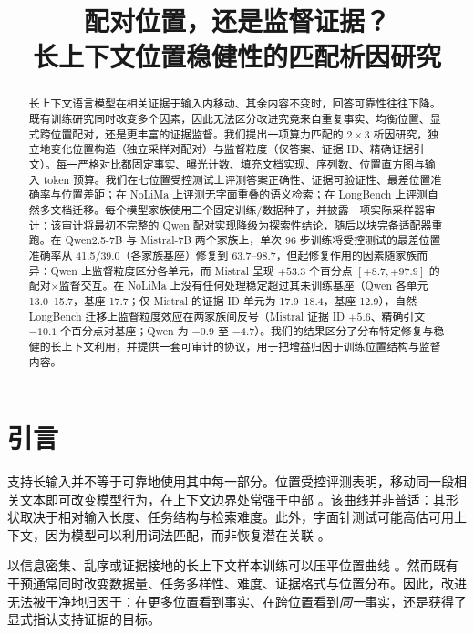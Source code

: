 \documentclass[11pt]{article}
\title{配对位置，还是监督证据？\\
长上下文位置稳健性的匹配析因研究}
\author{\pending{作者姓名、排序、单位与联系邮箱}}
\date{}
\begin{document}
\maketitle

\begin{abstract}
长上下文语言模型在相关证据于输入内移动、其余内容不变时，回答可靠性往往下降。既有训练研究同时改变多个因素，因此无法区分改进究竟来自重复事实、均衡位置、显式跨位置配对，还是更丰富的证据监督。我们提出一项算力匹配的 $2\times3$ 析因研究，独立地变化位置构造（独立采样对配对）与监督粒度（仅答案、证据 ID、精确证据引文）。每一严格对比都固定事实、曝光计数、填充文档实现、序列数、位置直方图与输入 token 预算。我们在七位置受控测试上评测答案正确性、证据可验证性、最差位置准确率与位置差距；在 NoLiMa 上评测无字面重叠的语义检索；在 LongBench 上评测自然多文档迁移。每个模型家族使用三个固定训练/数据种子，并披露一项实际采样器审计：该审计将最初不完整的 Qwen 配对实现降级为探索性结论，随后以块完备适配器重跑。在 Qwen2.5-7B 与 Mistral-7B 两个家族上，单次 96 步训练将受控测试的最差位置准确率从 41.5/39.0（各家族基座）修复到 63.7--98.7，但起修复作用的因素随家族而异：Qwen 上监督粒度区分各单元，而 Mistral 呈现 $+53.3$ 个百分点 $[+8.7,+97.9]$ 的配对$\times$监督交互。在 NoLiMa 上没有任何处理稳定超过其未训练基座（Qwen 各单元 13.0--15.7，基座 17.7；仅 Mistral 的证据 ID 单元为 17.9--18.4，基座 12.9），自然 LongBench 迁移上监督粒度效应在两家族间反号（Mistral 证据 ID $+5.6$、精确引文 $-10.1$ 个百分点对基座；Qwen 为 $-0.9$ 至 $-4.7$）。我们的结果区分了分布特定修复与稳健的长上下文利用，并提供一套可审计的协议，用于把增益归因于训练位置结构与监督内容。
\end{abstract}

\section{引言}

支持长输入并不等于可靠地使用其中每一部分。位置受控评测表明，移动同一段相关文本即可改变模型行为，在上下文边界处常强于中部 \citep{liu2024lost}。该曲线并非普适：其形状取决于相对输入长度、任务结构与检索难度。此外，字面针测试可能高估可用上下文，因为模型可以利用词法匹配，而非恢复潜在关联 \citep{modarressi2025nolima}。

以信息密集、乱序或证据接地的长上下文样本训练可以压平位置曲线 \citep{an2024film,he2024never,yuan2026longcrafter}。然而既有干预通常同时改变数据量、任务多样性、难度、证据格式与位置分布。因此，改进无法被干净地归因于：在更多位置看到事实、在跨位置看到\emph{同一}事实，还是获得了显式指认支持证据的目标。
\end{document}
